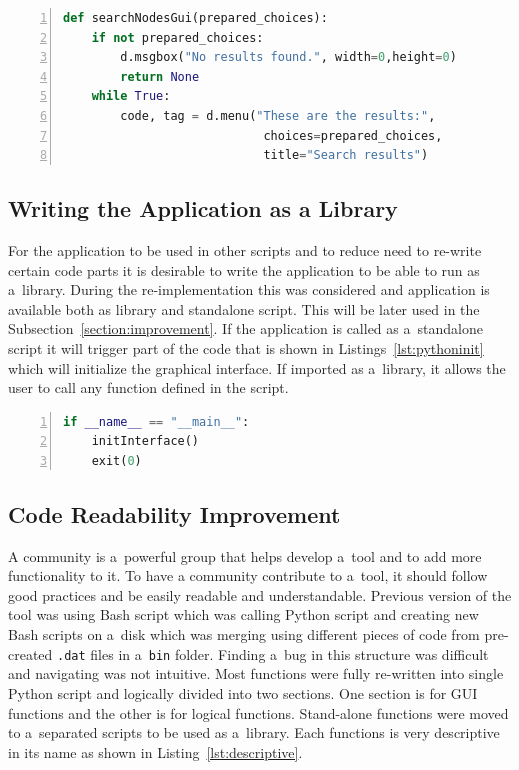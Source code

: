 {\noindent\begin{minipage}{\linewidth}
\begin{lstlisting}[language=Python, numbers=left, label={lst:removingresultlimit}, caption=Removing result limitation by passing choices as a~list argument., frame=single, showstringspaces=false, keywordstyle=\color{blue},captionpos=b]
def searchNodesGui(prepared_choices):
	if not prepared_choices:
		d.msgbox("No results found.", width=0,height=0)
		return None
	while True:
		code, tag = d.menu("These are the results:",
							choices=prepared_choices,
							title="Search results")
\end{lstlisting}
\end{minipage}

\subsection{Writing the Application as a Library}
For the application to be used in other scripts and to reduce need to re-write certain code parts it is desirable to write the application to be able to run as a~library. During the re-implementation this was considered and application is available both as library and standalone script. This will be later used in the Subsection~\ref{section:improvement}. If the application is called as a~standalone script it will trigger part of the code that is shown in Listings~\ref{lst:pythoninit} which will initialize the graphical interface. If imported as a~library, it allows the user to call any function defined in the script.

{\noindent\begin{minipage}{\linewidth}
\begin{lstlisting}[language=Python, numbers=left, label={lst:pythoninit}, caption=Condition to recognize that application is being called as a~standalone script., frame=single, showstringspaces=false, breaklines=true, keywordstyle=\color{blue},captionpos=b]
if __name__ == "__main__":
	initInterface()
	exit(0)
\end{lstlisting}
\end{minipage}

\subsection{Code Readability Improvement}
\label{subsection:readability}
A community is a~powerful group that helps develop a~tool and to add more functionality to it. To have a community contribute to a~tool, it should follow good practices and be easily readable and understandable. Previous version of the tool was using Bash script which was calling Python script and creating new Bash scripts on a~disk which was merging using different pieces of code from pre-created \texttt{.dat} files in a~\texttt{bin} folder. Finding a~bug in this structure was difficult and navigating was not intuitive. Most functions were fully re-written into single Python script and logically divided into two sections. One section is for GUI functions and the other is for logical functions. Stand-alone functions were moved to a~separated scripts to be used as a~library. Each functions is very descriptive in its name as shown in Listing~\ref{lst:descriptive}.

}}
